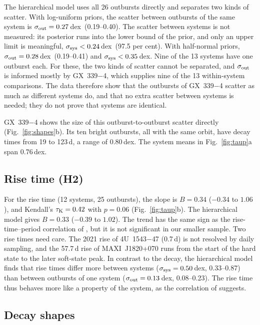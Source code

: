 \documentclass[fleqn,usenatbib]{mnras}
\newcommand{\dex}{\,dex}
\begin{document}
The hierarchical model uses all 26 outbursts directly and separates two kinds of scatter. With log-uniform priors, the scatter between outbursts of the same system is $\sigma_{\rm out}=0.27$\dex\ (0.19--0.40). The scatter between systems is not measured: its posterior runs into the lower bound of the prior, and only an upper limit is meaningful, $\sigma_{\rm sys}<0.24$\dex\ (97.5 per cent). With half-normal priors, $\sigma_{\rm out}=0.28$\dex\ (0.19--0.41) and $\sigma_{\rm sys}<0.35$\dex. Nine of the 13 systems have one outburst each. For these, the two kinds of scatter cannot be separated, and $\sigma_{\rm out}$ is informed mostly by GX~339$-$4, which supplies nine of the 13 within-system comparisons. The data therefore show that the outbursts of GX~339$-$4 scatter as much as different systems do, and that no extra scatter between systems is needed; they do not prove that systems are identical.

GX~339$-$4 shows the size of this outburst-to-outburst scatter directly (Fig.~\ref{fig:shapes}b). Its ten bright outbursts, all with the same orbit, have decay times from 19 to 123\,d, a range of 0.80\dex. The system means in Fig.~\ref{fig:taup}a span 0.76\dex.

\subsection{Rise time (H2)}
\label{sec:h2}

For the rise time (12 systems, 25 outbursts), the slope is $B=0.34$ ($-0.34$ to $1.06$), and Kendall's $\tau_{\rm K}=0.42$ with $p=0.06$ (Fig.~\ref{fig:taup}b). The hierarchical model gives $B=0.33$ ($-0.39$ to $1.02$). The trend has the same sign as the rise-time--period correlation of \citet{YanYu2015}, but it is not significant in our smaller sample. Two rise times need care. The 2021 rise of 4U~1543$-$47 (0.7\,d) is not resolved by daily sampling, and the 57.7\,d rise of MAXI~J1820+070 runs from the start of the hard state to the later soft-state peak. In contrast to the decay, the hierarchical model finds that rise times differ more between systems ($\sigma_{\rm sys}=0.50$\dex, 0.33--0.87) than between outbursts of one system ($\sigma_{\rm out}=0.13$\dex, 0.08--0.23). The rise time thus behaves more like a property of the system, as the correlation of \citet{YanYu2015} suggests.

\subsection{Decay shapes}
\label{sec:shapes}
\end{document}
